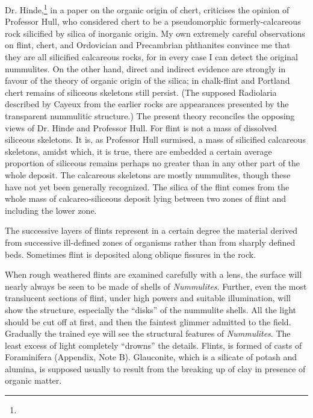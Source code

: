 \documentclass[a4paper, 12pt, oneside]{article}
\begin{document}
Dr. Hinde,\footnote{} in a paper on the organic origin of chert, criticises the opinion of Professor Hull, who considered chert to be a pseudomorphic formerly-calcareous rock silicified by silica of inorganic origin. My own extremely careful observations on flint, chert, and Ordovician and Precambrian phthanites convince me that they are all silicified calcareous rocks, for in every case I can detect the original nummulites. On the other hand, direct and indirect evidence are strongly in favour of the theory of organic origin of the silica; in chalk-flint and Portland chert remains of siliceous skeletons still persist. (The supposed Radiolaria described by Cayeux from the earlier rocks are appearances presented by the transparent nummulitic structure.) The present theory reconciles the opposing views of Dr. Hinde and Professor Hull. For flint is not a mass of dissolved siliceous skeletons. It is, as Professor Hull surmised, a mass of silicified calcareous skeletons, amidst which, it is true, there are embedded a certain average proportion of siliceous remains perhaps no greater than in any other part of the whole deposit. The calcareous skeletons are mostly nummulites, though these have not yet been generally recognized. The silica of the flint comes from the whole mass of calcareo-siliceous deposit lying between two zones of flint and including the lower zone.

The successive layers of flints represent in a certain degree the material derived from successive ill-defined zones of organisms rather than from sharply defined beds. Sometimes flint is deposited along oblique fissures in the rock.

When rough weathered flints are examined carefully with a lens, the surface will nearly always be seen to be made of shells of \emph{Nummulites}. Further, even the most translucent sections of flint, under high powers and suitable illumination, will show the structure, especially the ``disks'' of the nummulite shells. All the light should be cut off at first, and then the faintest glimmer admitted to the field. Gradually the trained eye will see the structural features of \emph{Nummulites}. The least excess of light completely ``drowns'' the details. Flints, is formed of casts of Foraminifera (Appendix, Note B). Glauconite, which is a silicate of potash and alumina, is supposed usually to result from the breaking up of clay in presence of organic matter.
\end{document}
